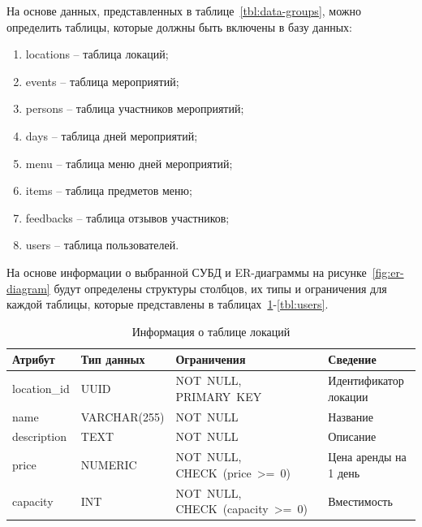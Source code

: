 На основе данных, представленных в таблице~\ref{tbl:data-groups}, можно определить таблицы, которые должны быть включены в базу данных:
\begin{enumerate}
	\item locations -- таблица локаций;
	\item events -- таблица мероприятий;
	\item persons -- таблица участников мероприятий;
	\item days -- таблица дней мероприятий;
	\item menu -- таблица меню дней мероприятий;
	\item items -- таблица предметов меню;
	\item feedbacks -- таблица отзывов участников;
	\item users -- таблица пользователей.
\end{enumerate}

На основе информации о выбранной СУБД и ER-диаграммы на рисунке~\ref{fig:er-diagram} будут определены структуры столбцов, их типы и ограничения для каждой таблицы, которые представлены в таблицах~\ref{tbl:locations}-\ref{tbl:users}.

\begin{table}[h]
	\centering
	\caption{Информация о таблице локаций}
	\begin{tabularx}{\textwidth}{|p{2.6cm}|X|p{6cm}|X|}
		\hline
		\textbf{Атрибут} & \textbf{Тип данных} & \textbf{Ограничения} & \textbf{Сведение} \\
		\hline
		location\_id & UUID & NOT~NULL, \newline PRIMARY~KEY & Идентификатор локации \\
		\hline
		name & VARCHAR(255) & NOT~NULL & Название \\
		\hline
		description & TEXT & NOT~NULL & Описание \\
		\hline
		price & NUMERIC & NOT~NULL, \newline CHECK~(price~>=~0) & Цена аренды на 1 день \\
		\hline
		capacity & INT & NOT~NULL, \newline CHECK~(capacity~>=~0) & Вместимость \\
		\hline
	\end{tabularx}
	\label{tbl:locations}
\end{table}

